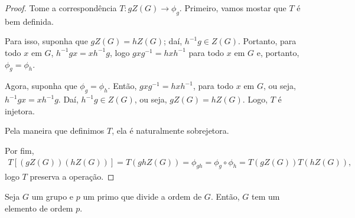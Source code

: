 	\begin{proof}
		Tome a correspondência $T:gZ(G)\to \phi_g$. Primeiro, vamos mostar que $T$ é bem definida. 
		\par\vspace{0.3cm} Para isso, suponha que $gZ(G) = hZ(G)$; daí, $h^{-1}g\in Z(G)$. 
		Portanto, para todo $x$ em $G$, $h^{-1}gx = xh^{-1}g$, logo $gxg^{-1} = hxh^{-1}$ para todo 
		$x$ em $G$ e, portanto, $\phi_g = \phi_h$. 
		\par\vspace{0.3cm} Agora, suponha que $\phi_g = \phi_h$. Então, $gxg^{-1} = hxh^{-1}$, 
		para todo $x$ em $G$, ou seja, $h^{-1}gx = xh^{-1}g$. Daí, $h^{-1}g\in Z(G)$, ou seja, 
		$gZ(G) = hZ(G)$. Logo, $T$ é injetora.
		\par\vspace{0.3cm} Pela maneira que definimos $T$, ela é naturalmente sobrejetora. 
		\par\vspace{0.3cm} Por fim,
		\begin{align*}
		    T[(gZ(G))(hZ(G))] = T(ghZ(G)) = \phi_{gh} = \phi_g\circ\phi_h = T(gZ(G))T(hZ(G)),
		\end{align*}
		logo $T$ preserva a operação.
	\end{proof}
	\begin{theorem}[Cauchy]
	\label{cauchy}
		Seja $G$ um grupo e $p$ um primo que divide a ordem de $G$. Então, $G$ tem um elemento de ordem $p$.
	\end{theorem}
	
